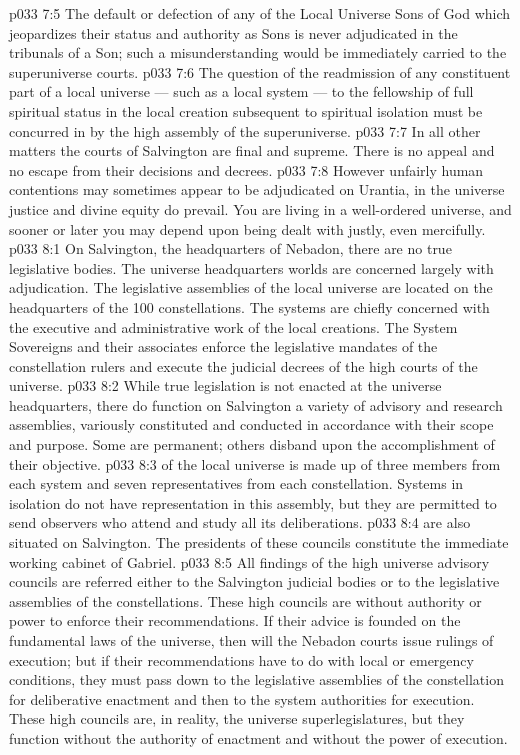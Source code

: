 \vs p033 7:5 \bibnobreakspace The default or defection of any of the Local Universe Sons of God which jeopardizes their status and authority as Sons is never adjudicated in the tribunals of a Son; such a misunderstanding would be immediately carried to the superuniverse courts.
\vs p033 7:6 \bibnobreakspace The question of the readmission of any constituent part of a local universe --- such as a local system --- to the fellowship of full spiritual status in the local creation subsequent to spiritual isolation must be concurred in by the high assembly of the superuniverse.
\vs p033 7:7 \pc In all other matters the courts of Salvington are final and supreme. There is no appeal and no escape from their decisions and decrees.
\vs p033 7:8 However unfairly human contentions may sometimes appear to be adjudicated on Urantia, in the universe justice and divine equity do prevail. You are living in a well\hyp{}ordered universe, and sooner or later you may depend upon being dealt with justly, even mercifully.
\vs p033 8:1 On Salvington, the headquarters of Nebadon, there are no true legislative bodies. The universe headquarters worlds are concerned largely with adjudication. The legislative assemblies of the local universe are located on the headquarters of the 100 constellations. The systems are chiefly concerned with the executive and administrative work of the local creations. The System Sovereigns and their associates enforce the legislative mandates of the constellation rulers and execute the judicial decrees of the high courts of the universe.
\vs p033 8:2 While true legislation is not enacted at the universe headquarters, there do function on Salvington a variety of advisory and research assemblies, variously constituted and conducted in accordance with their scope and purpose. Some are permanent; others disband upon the accomplishment of their objective.
\vs p033 8:3 \pc {} of the local universe is made up of three members from each system and seven representatives from each constellation. Systems in isolation do not have representation in this assembly, but they are permitted to send observers who attend and study all its deliberations.
\vs p033 8:4 \pc {} are also situated on Salvington. The presidents of these councils constitute the immediate working cabinet of Gabriel.
\vs p033 8:5 \pc All findings of the high universe advisory councils are referred either to the Salvington judicial bodies or to the legislative assemblies of the constellations. These high councils are without authority or power to enforce their recommendations. If their advice is founded on the fundamental laws of the universe, then will the Nebadon courts issue rulings of execution; but if their recommendations have to do with local or emergency conditions, they must pass down to the legislative assemblies of the constellation for deliberative enactment and then to the system authorities for execution. These high councils are, in reality, the universe superlegislatures, but they function without the authority of enactment and without the power of execution.
